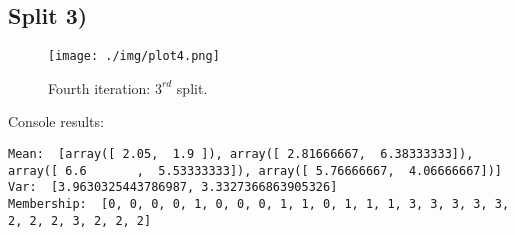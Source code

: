 \subsection*{Split 3)}
\label{subsection:Split 4}
\begin{figure}[h!]
    \centering
    \texttt{[image: ./img/plot4.png]}
    \caption{Fourth iteration: $3^{rd}$ split.}
    \label{fig:plot2}
\end{figure}
Console results:
\begin{lstlisting}
Mean:  [array([ 2.05,  1.9 ]), array([ 2.81666667,  6.38333333]), array([ 6.6       ,  5.53333333]), array([ 5.76666667,  4.06666667])]
Var:  [3.9630325443786987, 3.3327366863905326]
Membership:  [0, 0, 0, 0, 1, 0, 0, 0, 1, 1, 0, 1, 1, 1, 3, 3, 3, 3, 3, 2, 2, 2, 3, 2, 2, 2]
\end{lstlisting}

